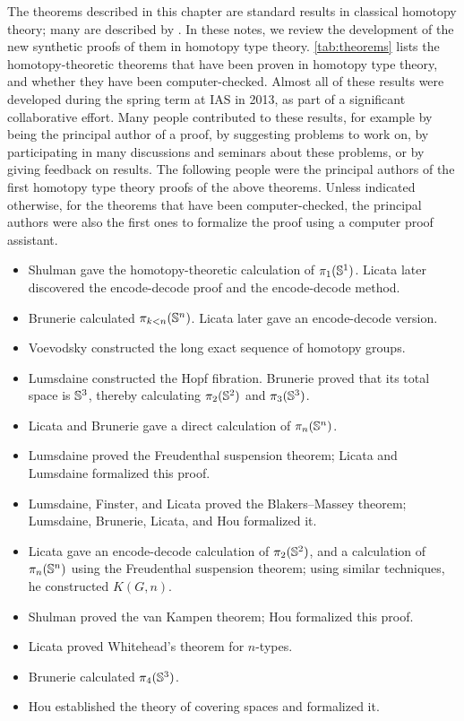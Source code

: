 The theorems described in this chapter are standard results in classical
homotopy theory; many are described by \cite{hatcher02topology}.  In these
notes, we review the development of the new synthetic proofs of them in homotopy
type theory.  \cref{tab:theorems} lists the homotopy-theoretic
theorems that have been proven in homotopy type theory, and whether they
have been computer-checked.
Almost all of these results were developed during the spring term at IAS
in 2013, as part of a significant collaborative effort.  Many people
contributed to these results, for example by being the principal author
of a proof, by suggesting problems to work on, by participating in many
discussions and seminars about these problems, or by giving feedback on
results.  The following people were the principal authors of the first
homotopy type theory proofs of the above theorems. Unless indicated otherwise, for the
theorems that have been computer-checked, the principal authors were
also the first ones to formalize the proof using a computer proof
assistant.
\begin{itemize}
\item
Shulman gave the homotopy-theoretic calculation of $\pi_1(\mathbb{S}^1)$.  Licata later discovered the
encode-decode proof and the encode-decode method.

\item
Brunerie calculated $\pi_{k<n}(\mathbb{S} ^ n)$.
Licata later gave an encode-decode version.

\item Voevodsky constructed the long exact sequence of homotopy groups.

\item Lumsdaine constructed the Hopf fibration.
  Brunerie proved that its total space is $\mathbb{S} ^3$, thereby calculating $\pi_2(\mathbb{S} ^2)$ and
  $\pi_3(\mathbb{S} ^3)$.

\item Licata and Brunerie gave a direct calculation of
$\pi_n(\mathbb{S} ^n)$.

\item
  Lumsdaine proved the Freudenthal suspension theorem; Licata and
  Lumsdaine formalized this proof.
\item Lumsdaine, Finster, and Licata proved the Blakers--Massey theorem;
  Lumsdaine, Brunerie, Licata, and Hou formalized it.

\item
Licata gave an encode-decode calculation of $\pi_2(\mathbb{S} ^2)$, and a
calculation of $\pi_n(\mathbb{S} ^n)$ using the Freudenthal suspension theorem; using similar
techniques, he constructed $K(G,n)$.

\item
Shulman proved the van Kampen theorem; Hou formalized this proof.

\item
Licata proved Whitehead's theorem for $n$-types.

\item Brunerie calculated $\pi_4(\mathbb{S} ^3)$.

\item
Hou established the theory of covering spaces and formalized it.
\end{itemize}

